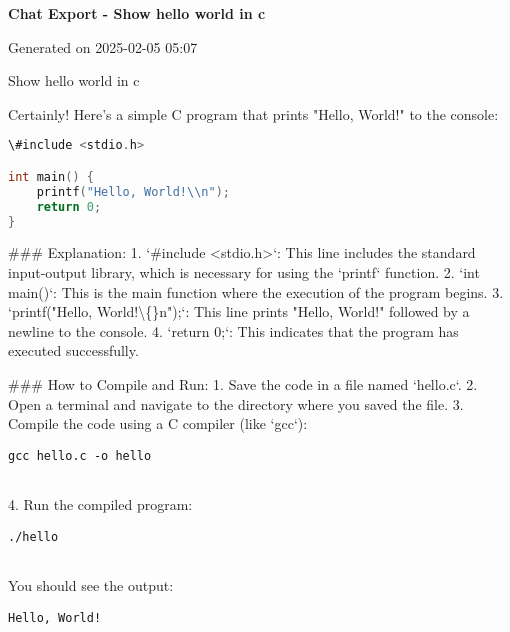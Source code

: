\documentclass{article}
\begin{document}
\begin{center}
\Large\textbf{Chat Export - Show hello world in c}

\normalsize Generated on 2025-02-05 05:07
\end{center}
\bigskip


Show hello world in c

\bigskip



Certainly! Here's a simple C program that prints "Hello, World!" to the console:



\begin{lstlisting}[language=c]
\#include <stdio.h>

int main() {
    printf("Hello, World!\\n");
    return 0;
}

\end{lstlisting}



\#\#\# Explanation:
1. `\#include <stdio.h>`: This line includes the standard input-output library, which is necessary for using the `printf` function.
2. `int main()`: This is the main function where the execution of the program begins.
3. `printf("Hello, World!\textbackslash\{\}n");`: This line prints "Hello, World!" followed by a newline to the console.
4. `return 0;`: This indicates that the program has executed successfully.

\#\#\# How to Compile and Run:
1. Save the code in a file named `hello.c`.
2. Open a terminal and navigate to the directory where you saved the file.
3. Compile the code using a C compiler (like `gcc`):
   

\begin{lstlisting}[language=text]
   gcc hello.c -o hello
   
\end{lstlisting}


4. Run the compiled program:
   

\begin{lstlisting}[language=text]
   ./hello
   
\end{lstlisting}



You should see the output:


\begin{lstlisting}[language=text]
Hello, World!

\end{lstlisting}


\bigskip
\end{document}
